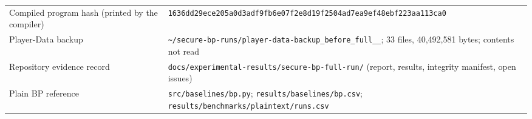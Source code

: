 {\begin{longtable}{@{}>{\raggedright\arraybackslash}p{3.8cm}>{\raggedright\arraybackslash}p{10.0cm}@{}}
Compiled program hash (printed by the compiler) & \texttt{1636dd29ece205a0\allowbreak d3adf9fb6e07f2e8\allowbreak d19f2504ad7ea9ef\allowbreak 48ebf223aa113ca0} \\
Player-Data backup & \texttt{\textasciitilde/secure-bp-runs/\allowbreak player-data-backup\_\allowbreak before\_\allowbreak full\_\allowbreak 20261115\_\allowbreak 234946}; 33 files, 40{,}492{,}581 bytes; contents not read \\
Repository evidence record & \texttt{docs/experimental-results/\allowbreak secure-bp-full-run/} (report, results, integrity manifest, open issues) \\
Plain BP reference & \texttt{src/baselines/bp.py}; \texttt{results/baselines/bp.csv}; \texttt{results/benchmarks/plaintext/runs.csv} \\
\bottomrule
\end{longtable}
}

